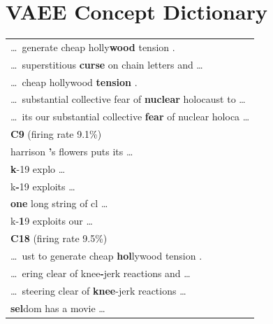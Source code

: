 \section*{VAEE Concept Dictionary}

\footnotesize

\begin{longtable}{@{}>{\ttfamily}p{\linewidth}@{}}
    \toprule
    \endhead
    {\normalfont\textbf{C3} \hfill (firing rate 10.0\%)}\\
    \cmidrule(){1-1}
    \dots\ generate cheap holly\textbf{wood} tension .\\
    \dots\ superstitious\textbf{ curse} on chain letters and \dots\\
    \dots\ cheap hollywood\textbf{ tension} .\\
    \dots\ substantial collective fear of\textbf{ nuclear} holocaust to \dots\\
    \dots\ its our substantial collective\textbf{ fear} of nuclear holoca \dots\\
    \addlinespace
    {\normalfont\textbf{C9} \hfill (firing rate 9.1\%)}\\
    \cmidrule(){1-1}
    harrison\textbf{ '}s flowers puts its \dots\\
    \textbf{k}-19 explo \dots\\
    k\textbf{-}19 exploits \dots\\
    \textbf{one} long string of cl \dots\\
    k-\textbf{1}9 exploits our \dots\\
    \addlinespace
    {\normalfont\textbf{C18} \hfill (firing rate 9.5\%)}\\
    \cmidrule(){1-1}
    \dots\ ust to generate cheap\textbf{ hol}lywood tension .\\
    \dots\ ering clear of knee\textbf{-}jerk reactions and \dots\\
    \dots\ steering clear of\textbf{ knee}-jerk reactions \dots\\
    \textbf{sel}dom has a movie \dots\\

\end{longtable}

